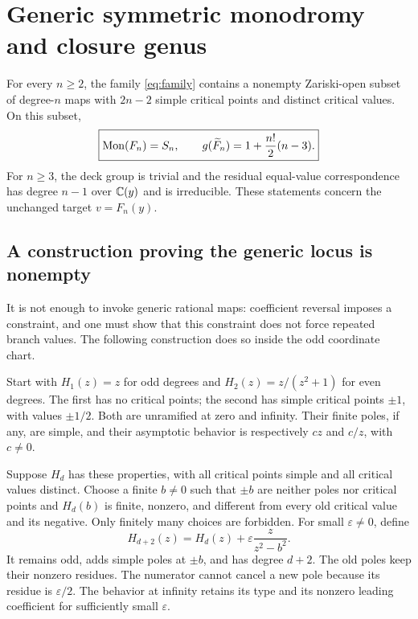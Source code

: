 \section{Generic symmetric monodromy and closure genus}\label{sec:generic}
\begin{theorem}\label{thm:generic}
For every \(n\ge2\), the family \eqref{eq:family} contains a nonempty Zariski-open subset of degree-\(n\) maps with \(2n-2\) simple critical points and distinct critical values. On this subset,
\begin{equation}\label{eq:main}
 \boxed{\operatorname{Mon}(F_n)=S_n,\qquad
 g(\widetilde F_n)=1+\frac{n!}{2}(n-3).}
\end{equation}
For \(n\ge3\), the deck group is trivial and the residual equal-value correspondence has degree \(n-1\) over \(\mathbb C(y)\) and is irreducible. These statements concern the unchanged target \(v=F_n(y)\).
\end{theorem}

\subsection{A construction proving the generic locus is nonempty}
It is not enough to invoke generic rational maps: coefficient reversal imposes a constraint, and one must show that this constraint does not force repeated branch values. The following construction does so inside the odd coordinate chart.

Start with \(H_1(z)=z\) for odd degrees and \(H_2(z)=z/(z^2+1)\) for even degrees. The first has no critical points; the second has simple critical points \(\pm1\), with values \(\pm1/2\). Both are unramified at zero and infinity. Their finite poles, if any, are simple, and their asymptotic behavior is respectively \(cz\) and \(c/z\), with \(c\ne0\).

Suppose \(H_d\) has these properties, with all critical points simple and all critical values distinct. Choose a finite \(b\ne0\) such that \(\pm b\) are neither poles nor critical points and \(H_d(b)\) is finite, nonzero, and different from every old critical value and its negative. Only finitely many choices are forbidden. For small \(\varepsilon\ne0\), define
\begin{equation}\label{eq:insertion}
 H_{d+2}(z)=H_d(z)+\varepsilon\frac{z}{z^2-b^2}.
\end{equation}
It remains odd, adds simple poles at \(\pm b\), and has degree \(d+2\). The old poles keep their nonzero residues. The numerator cannot cancel a new pole because its residue is \(\varepsilon/2\). The behavior at infinity retains its type and its nonzero leading coefficient for sufficiently small \(\varepsilon\).

